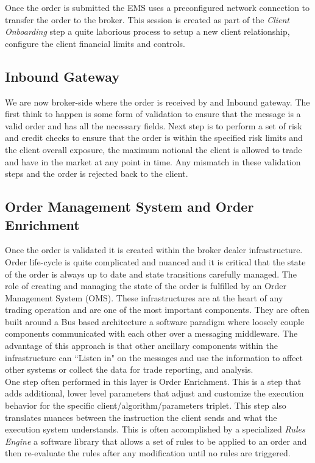 Once the order is submitted the EMS uses a preconfigured network connection to transfer the order to the broker. This session is created as part of the \emph{Client Onboarding} step a quite laborious process to setup a new client relationship, configure the client financial limits and controls.

\subsection{Inbound Gateway}
We are now broker-side where the order is received by and Inbound gateway. The first think to happen is some form of validation to ensure that the message is a valid order and has all the necessary fields. Next step is to perform a set of risk and credit checks to ensure that the order is within the specified risk limits and the client overall exposure, the maximum notional the client is allowed to trade and have in the market at any point in time. Any mismatch in these validation steps and the order is rejected back to the client.

\subsection{Order Management System and Order Enrichment}
Once the order is validated it is created within the broker dealer infrastructure. Order life-cycle is quite complicated and nuanced and it is critical that the state of the order is always up to date and state transitions carefully managed. The role of creating and managing the state of the order is fulfilled by an Order Management System (OMS). These infrastructures are at the heart of any trading operation and are one of the most important components. They are often built around a Bus based architecture a software paradigm where loosely couple components communicated with each other over a messaging middleware. The advantage of this approach is that other ancillary components within the infrastructure can ``Listen in" on the messages and use the information to affect other systems or collect the data for trade reporting, and analysis.\\

One step often performed in this layer is Order Enrichment. This is a step that adds additional, lower level parameters that adjust and customize the execution behavior for the specific client/algorithm/parameters triplet. This step also translates nuances between the instruction the client sends and what the execution system understands. This is often accomplished by a specialized \emph{Rules Engine} a software library that allows a set of rules to be applied to an order and then re-evaluate the rules after any modification until no rules are triggered.

